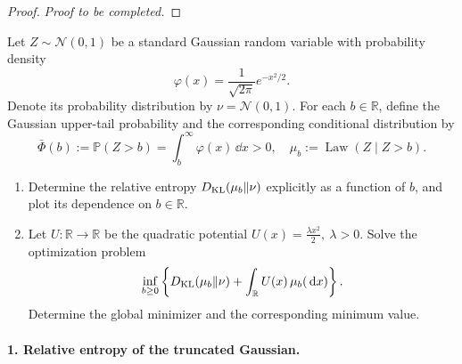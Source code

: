 \documentclass[12pt,a4paper,oneside]{book}
\begin{document}
\begin{proof}
\noindent\textit{Proof to be completed.}
\end{proof}


\begin{example}
\label{ex:truncated-gaussian-kl}
\label{src:p11q3}

\begin{Question}
Let $Z\sim\mathcal N(0,1)$ be a standard Gaussian random variable with probability density
\begin{equation*}
    \varphi(x)=\frac{1}{\sqrt{2\pi}}e^{-x^2/2}.
\end{equation*}
Denote its probability distribution by $\nu=\mathcal N(0,1)$. For each $b\in\mathbb R$, define the Gaussian upper-tail
probability and the corresponding conditional distribution by
\begin{equation*}
    \bar\Phi(b) :=\mathbb P(Z>b) = \int_b^\infty\varphi(x)\,\dd x>0, \quad
    \mu_b:=\operatorname{Law}(Z\mid Z>b).
\end{equation*}

\begin{enumerate}
    \item Determine the relative entropy $D_{\mathrm{KL}}(\mu_b\Vert\nu)$ explicitly as a function of $b$, and plot its dependence
        on $b\in\mathbb R$.

    \item Let $U:\mathbb R\to\mathbb R$ be the quadratic potential $U(x)=\frac{\lambda x^2}{2},\ \lambda>0$. Solve the
        optimization problem
        \begin{equation*}
            \inf_{b\geq0}
                \left\{
                    D_{\mathrm{KL}}(\mu_b\Vert\nu) + \int_{\mathbb R}U(x)\,\mu_b(\,\mathrm{d} x)
                \right\}.
        \end{equation*}
        Determine the global minimizer and the corresponding minimum value.
\end{enumerate}
\end{Question}

\begin{solution}

\paragraph{1. Relative entropy of the truncated Gaussian.}


\end{solution}
\end{example}
\end{document}
